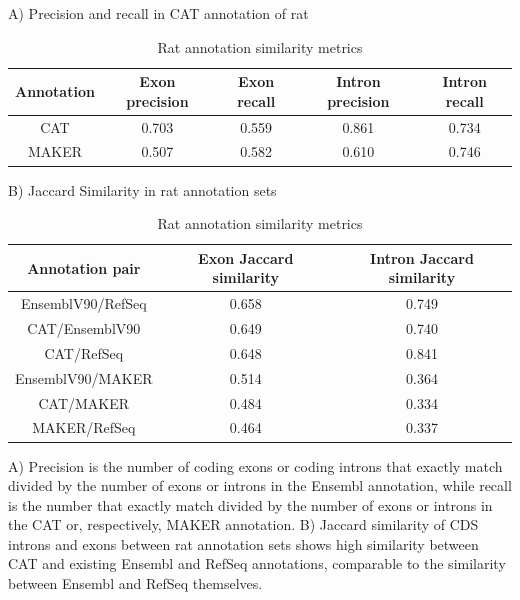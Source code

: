 \documentclass[fleqn,10pt]{wlscirep}
\begin{document}
\begin{table}
\centering
A) Precision and recall in CAT annotation of rat\\
\begin{tabular}{|c|c|c|c|c|} \hline
Annotation & Exon precision & Exon recall & Intron precision & Intron recall \\ \hline
CAT & 0.703 & 0.559 & 0.861 & 0.734 \\ \hline
MAKER & 0.507 & 0.582 & 0.610 & 0.746 \\ \hline
\end{tabular}

\vspace{5mm}
B) Jaccard Similarity in rat annotation sets \\
\begin{tabular}{|c|c|c|} \hline
Annotation pair & Exon Jaccard similarity & Intron Jaccard similarity \\ \hline
EnsemblV90/RefSeq & 0.658 & 0.749 \\ \hline
CAT/EnsemblV90 & 0.649 & 0.740 \\ \hline
CAT/RefSeq & 0.648 & 0.841 \\ \hline
EnsemblV90/MAKER & 0.514 & 0.364 \\ \hline
CAT/MAKER & 0.484 & 0.334 \\ \hline
MAKER/RefSeq & 0.464 & 0.337 \\ \hline
\end{tabular}
\caption{Rat annotation similarity metrics}
A) Precision is the number of coding exons or coding introns that exactly match divided by the number of exons or introns in the Ensembl annotation, while recall is the number that exactly match divided by the number of exons or introns in the CAT or, respectively, MAKER annotation. B) Jaccard similarity of CDS introns and exons between rat annotation sets shows high similarity between CAT and existing Ensembl and RefSeq annotations, comparable to the similarity between Ensembl and RefSeq themselves.
\label{table:rat_similarity}
\end{table}
\end{document}
